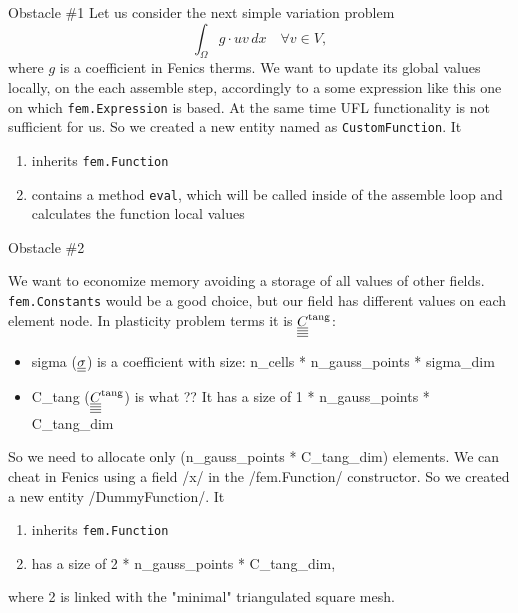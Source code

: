 \documentclass[9pt]{beamer}
\begin{document}
\begin{frame}{Obstacle \#1}
  Let us consider the next simple variation problem
  \begin{equation}
    \int_{\Omega} g \cdot u v \, dx \quad \forall v \in V,
  \end{equation}
  where $g$ is a coefficient in Fenics therms.
  We want to update its global values locally, on the each assemble step, accordingly to a some expression like this one on which \texttt{fem.Expression} is based. At the same time UFL functionality is not sufficient for us. So we created a new entity named as \texttt{CustomFunction}. It 
  \begin{enumerate}
    \item inherits \texttt{fem.Function}
    \item contains a method \texttt{eval}, which will be called inside of the assemble loop and calculates the function local values
  \end{enumerate}
\end{frame}

\begin{frame}{Obstacle \#2}

  We want to economize memory avoiding a storage of all values of other fields. \texttt{fem.Constants} would be a good choice, but our field has different values on each element node. In plasticity problem terms it is $\underline{\underline{\underline{\underline{C}}}}^\text{tang}$:
  \begin{itemize}
    \item sigma ($\underline{\underline{\sigma}}$) is a coefficient with size: n\_cells * n\_gauss\_points * sigma\_dim
    \item C\_tang ($\underline{\underline{\underline{\underline{C}}}}^\text{tang}$) is what ?? It has a size of 1 * n\_gauss\_points * C\_tang\_dim
  \end{itemize}

  So we need to allocate only (n\_gauss\_points * C\_tang\_dim) elements. We can cheat in Fenics using a field \mypython/x/ in the \mypython/fem.Function/ constructor. So we created a new entity \mypython/DummyFunction/. It 
  \begin{enumerate}
    \item inherits \texttt{fem.Function}
    \item has a size of 2 * n\_gauss\_points * C\_tang\_dim,
  \end{enumerate}
  where 2 is linked with the "minimal" triangulated square mesh.
\end{frame}
\end{document}
